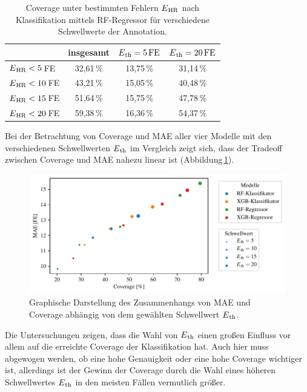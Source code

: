 \begin{table}[H]
	\centering
  	\begin{tabular}{l || c | c | c}
 											& insgesamt 		& $E\textsubscript{th}= 5\text{\,}\si{FE}$ & $E\textsubscript{th}= 20\text{\,}\si{FE}$\\\hline
 		$E\textsubscript{HR} < 5$\,\si{FE} 	&  32{,}61\,\% 	& 13,75\,\% 			& 31,14\,\%\\
 		$E\textsubscript{HR} < 10$\,\si{FE} 	&  43{,}21\,\% 	& 15,05\,\% 			& 40,48\,\%\\
 		$E\textsubscript{HR} < 15$\,\si{FE} 	&  51{,}64\,\% 	& 15,75\,\% 			& 47,78\,\%\\
 		$E\textsubscript{HR} < 20$\,\si{FE} 	&  59{,}38\,\% 	& 16,36\,\% 			& 54,37\,\%\\
 	\end{tabular}
 	\caption{Coverage unter bestimmten Fehlern $E\textsubscript{HR}$ nach Klassifikation mittels \ac{RF}-Regressor für verschiedene Schwellwerte der Annotation.}
 	\label{fig:rf-regr-cov-eth}
\end{table}


Bei der Betrachtung von Coverage und \ac{MAE} aller vier Modelle mit den verschiedenen Schwellwerten $E\textsubscript{th}$ im Vergleich zeigt sich, dass der Tradeoff zwischen Coverage und \ac{MAE} nahezu linear ist (Abbildung\,\ref{fig:threshold-variation}).

\begin{figure}[H]
	\centering
	\includegraphics[scale=0.95]{pic/threshold-variation.pdf}
 	\caption{Graphische Darstellung des Zusammenhangs von \ac{MAE} und Coverage abhängig von dem gewählten Schwellwert $E\textsubscript{th}$.}
 	\label{fig:threshold-variation}
\end{figure}

Die Untersuchungen zeigen, dass die Wahl von $E\textsubscript{th}$ einen großen Einfluss vor allem auf die erreichte Coverage der Klassifikation hat. Auch hier muss abgewogen werden, ob eine hohe Genauigkeit oder eine hohe Coverage wichtiger ist, allerdings ist der Gewinn der Coverage durch die Wahl eines höheren Schwellwertes $E\textsubscript{th}$ in den meisten Fällen vermutlich größer.

